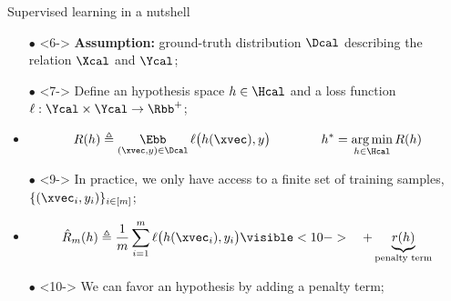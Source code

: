 \begin{frame}{Supervised learning in a nutshell}
  \vspace{0.2cm}
  {\small
    \begin{itemize}
      \item[$\bullet$]<6-> \textbf{Assumption:} ground-truth distribution $\Dcal$ describing the relation $\Xcal$ and $\Ycal$;
      \item[$\bullet$]<7-> Define an hypothesis space $h \in \Hcal$ and a loss function $\ell: \Ycal \times \Ycal \rightarrow \Rbb^{+}$;
      \item<8->
      \vspace{-0.2cm}
      \begin{equation}
	R(h) \triangleq \E_{(\xvec, y) \in \Dcal} \ell \big( h(\xvec), y \big) \quad \quad \quad \quad h^* = \argmin_{h \in \Hcal} R(h)
      \end{equation}
      \item[$\bullet$]<9-> In practice, we only have access to a finite set of training samples, $\{(\xvec_i, y_i)\}_{i \in [m]}$; %
      \item<9->
      \vspace{-0.2cm}
      \begin{equation}
        \hat{R}_m(h) \triangleq \frac{1}{m} \sum_{i=1}^{m} \ell \big(h(\xvec_i), y_i \big)  \visible<10->{\quad + \underbrace{r(h)}_{\text{penalty term}}}
      \end{equation}
      \item[$\bullet$]<10-> We can favor an hypothesis by adding a penalty term;
    \end{itemize}
  }



\end{frame}
